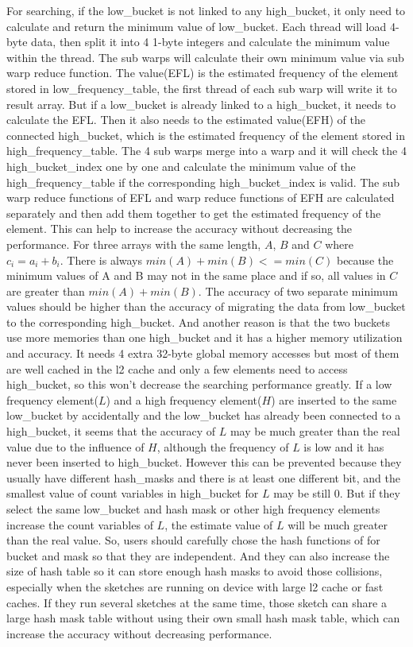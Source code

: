 \documentclass[conference]{IEEEtran}
\begin{document}
For searching, if the low\_bucket is not linked to any high\_bucket, it only need to calculate and return the minimum value of low\_bucket. Each thread will load 4-byte data, then split it into 4 1-byte integers and calculate the minimum value within the thread. The sub warps will calculate their own minimum value via sub warp reduce function. The value(EFL) is the estimated frequency of the element stored in low\_frequency\_table, the first thread of each sub warp will write it to result array. But if a low\_bucket is already linked to a high\_bucket, it needs to calculate the EFL. Then it also needs to the estimated value(EFH) of the connected high\_bucket, which is the estimated frequency of the element stored in high\_frequency\_table. The 4 sub warps merge into a warp and it will check the 4 high\_bucket\_index one by one and calculate the minimum value of the high\_frequency\_table if the corresponding high\_bucket\_index is valid. The sub warp reduce functions of EFL and warp reduce functions of EFH are calculated separately and then add them together to get the estimated frequency of the element. This can help to increase the accuracy without decreasing the performance. For three arrays with the same length, $A$, $B$ and $C$ where $c_i = a_i + b_i$. There is always $min(A) + min(B) <= min(C)$ because the minimum values of A and B may not in the same place and if so, all values in $C$ are greater than $min(A) + min(B)$. The accuracy of two separate minimum values should be higher than the accuracy of migrating the data from low\_bucket to the corresponding high\_bucket. And another reason is that the two buckets use more memories than one high\_bucket and it has a higher memory utilization and accuracy. It needs 4 extra 32-byte global memory accesses but most of them are well cached in the l2 cache and only a few elements need to access high\_bucket, so this won't decrease the searching performance greatly.
If a low frequency element($L$) and a high frequency element($H$) are inserted to the same low\_bucket by accidentally and the low\_bucket has already been connected to a high\_bucket, it seems that the accuracy of $L$ may be much greater than the real value due to the influence of $H$, although the frequency of $L$ is low and it has never been inserted to high\_bucket. However this can be prevented because they usually have different hash\_masks and there is at least one different bit, and the smallest value of count variables in high\_bucket for $L$ may be still 0. But if they select the same low\_bucket and hash mask or other high frequency elements increase the count variables of $L$, the estimate value of $L$ will be much greater than the real value. So, users should carefully chose the hash functions of for bucket and mask so that they are independent. And they can also increase the size of hash table so it can store enough hash masks to avoid those collisions, especially when the sketches are running on device with large l2 cache or fast caches. If they run several sketches at the same time, those sketch can share a large hash mask table without using their own small hash mask table, which can increase the accuracy without decreasing performance. 
\end{document}
